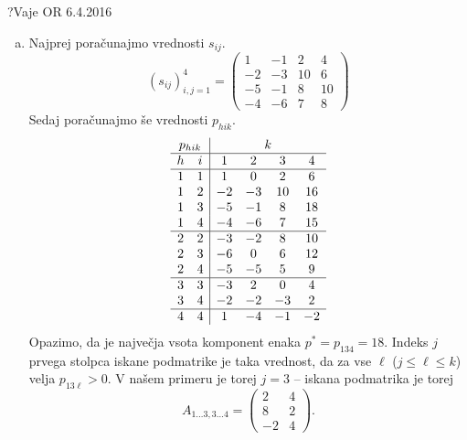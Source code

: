 \begin{naloga}{?}{Vaje OR 6.4.2016}
\begin{odgovor}
\begin{enumerate}[(a)]
\item Najprej poračunajmo vrednosti $s_{ij}$.
$$
(s_{ij})_{i,j=1}^4 = \begin{pmatrix}
 1 & -1 &  2 &  4 \\
-2 & -3 & 10 &  6 \\
-5 & -1 &  8 & 10 \\
-4 & -6 &  7 &  8
\end{pmatrix}
$$
Sedaj poračunajmo še vrednosti $p_{hik}$.
$$
\begin{array}{cc|cccc}
\multicolumn{2}{c|}{p_{hik}} & \multicolumn{4}{c}{k} \\ \hline
h & i &  1 &  2 &  3 &  4 \\ \hline
1 & 1 &  1 &  0 &  2 &  6 \\
1 & 2 & -2 & -3 & 10 & 16 \\
1 & 3 & -5 & -1 &  8 & 18 \\
1 & 4 & -4 & -6 &  7 & 15 \\ \hline
2 & 2 & -3 & -2 &  8 & 10 \\
2 & 3 & -6 &  0 &  6 & 12 \\
2 & 4 & -5 & -5 &  5 &  9 \\ \hline
3 & 3 & -3 &  2 &  0 &  4 \\
3 & 4 & -2 & -2 & -3 &  2 \\ \hline
4 & 4 &  1 & -4 & -1 & -2
\end{array}
$$
Opazimo, da je največja vsota komponent enaka $p^* = p_{134} = 18$.
Indeks $j$ prvega stolpca iskane podmatrike je taka vrednost,
da za vse $\ell$ ($j \le \ell \le k$) velja $p_{13\ell} > 0$.
V našem primeru je torej $j = 3$
-- iskana podmatrika je torej
$$
A_{1 \dots 3, 3 \dots 4} = \begin{pmatrix}
 2 &  4 \\
 8 &  2 \\
-2 &  4
\end{pmatrix} .
$$


\end{enumerate}
\end{odgovor}
\end{naloga}
